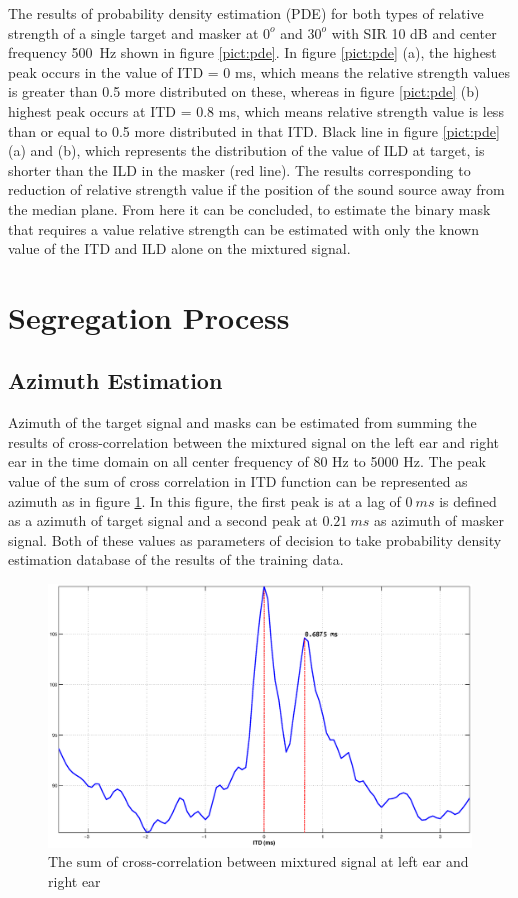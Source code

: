 \documentclass[a4paper]{jpconf}
\begin{document}
The results of probability density estimation (PDE) for both types of relative strength of a single target and masker at $0^o$ and $30^o$ with SIR 10 dB and center frequency 500~Hz shown in figure \ref{pict:pde}. In figure \ref{pict:pde} (a), the highest peak occurs in the value of ITD = 0 ms, which means the relative strength values is greater than 0.5 more distributed on these, whereas in figure \ref{pict:pde} (b) highest peak occurs at ITD = 0.8 ms, which means relative strength value is less than or equal to 0.5 more distributed in that ITD. Black line in figure \ref{pict:pde} (a) and (b), which represents the distribution of the value of ILD at target, is shorter than the ILD in the masker (red line). The results corresponding to reduction of relative strength value if the position of the sound source away from the median plane. From here it can be concluded, to estimate the binary mask that requires a value relative strength can be estimated with only the known value of the ITD and ILD alone on the mixtured signal.

\section{Segregation Process}
\subsection{Azimuth Estimation}
Azimuth of the target signal and masks can be estimated from summing the results of cross-correlation between the mixtured signal on the left ear and right ear in the time domain on all center frequency of 80 Hz to 5000 Hz. The peak value of the sum of cross correlation in ITD function can be represented as azimuth as in figure \ref{pict:azimuth}. In this figure, the first peak is at a lag of $0~ms$ is defined as a azimuth of target signal and a second peak at $0.21~ms$ as azimuth of masker signal. Both of these values as parameters of decision to take probability density estimation database of the results of the training data.

\begin{figure}[h]
    \centering
    \includegraphics[width=5.5in]{pict/azimuth.eps}
    \caption{\label{pict:azimuth}The sum of cross-correlation between mixtured signal at left ear and right ear}
\end{figure} 
\end{document}
